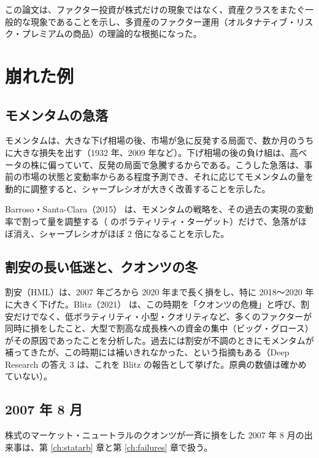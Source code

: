 この論文は、ファクター投資が株式だけの現象ではなく、資産クラスをまたぐ一般的な現象であることを示し、多資産のファクター運用（オルタナティブ・リスク・プレミアムの商品）の理論的な根拠になった。

\section{崩れた例}

\subsection{モメンタムの急落}

\begin{paperbox}
モメンタムは、大きな下げ相場の後、市場が急に反発する局面で、数か月のうちに大きな損失を出す（1932 年、2009 年など）。下げ相場の後の負け組は、高ベータの株に偏っていて、反発の局面で急騰するからである。こうした急落は、事前の市場の状態と変動率からある程度予測でき、それに応じてモメンタムの量を動的に調整すると、シャープレシオが大きく改善することを示した。
\end{paperbox}

Barroso・Santa-Clara（2015）\cite{barroso2015} は、モメンタムの戦略を、その過去の実現の変動率で割って量を調整する（ のボラティリティ・ターゲット）だけで、急落がほぼ消え、シャープレシオがほぼ 2 倍になることを示した。

\subsection{割安の長い低迷と、クオンツの冬}

割安（HML）は、2007 年ごろから 2020 年まで長く損をし、特に 2018〜2020 年に大きく下げた。Blitz（2021）\cite{blitz2021} は、この時期を「クオンツの危機」と呼び、割安だけでなく、低ボラティリティ・小型・クオリティなど、多くのファクターが同時に損をしたこと、大型で割高な成長株への資金の集中（ビッグ・グロース）がその原因であったことを分析した。過去には割安が不調のときにモメンタムが補ってきたが、この時期には補いきれなかった、という指摘もある（Deep Research の答え 3 は、これを Blitz の報告として挙げた。原典の数値は確かめていない）。

\subsection{2007 年 8 月}

株式のマーケット・ニュートラルのクオンツが一斉に損をした 2007 年 8 月の出来事は、第 \ref{ch:statarb} 章と第 \ref{ch:failures} 章で扱う。

